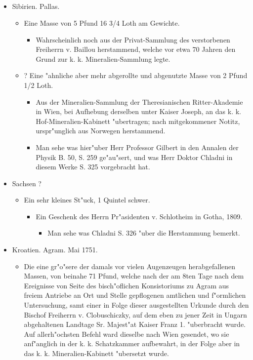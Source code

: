 \documentclass[a4paper, 11pt, oneside, polutonikogreek, german]{article}
\begin{document}
\subsection{}
\begin{itemize}
    \item Sibirien. Pallas.
    \begin{itemize}
        \item Eine Masse von 5 Pfund 16 3/4 Loth am Gewichte.
        \begin{itemize}
            \item Wahrscheinlich noch aus der Privat-Sammlung des verstorbenen Freiherrn v. Baillou herstammend, welche vor etwa 70 Jahren den Grund zur k. k. Mineralien-Sammlung legte.
        \end{itemize}
        \item ? Eine "ahnliche aber mehr abgerollte und abgenutzte Masse von 2 Pfund 1/2 Loth.
        \begin{itemize}
            \item Aus der Mineralien-Sammlung der Theresianischen Ritter-Akademie in Wien, bei Aufhebung derselben unter Kaiser Joseph, an das k. k. Hof-Mineralien-Kabinett "ubertragen; nach mitgekommener Notitz, urspr"unglich aus Norwegen herstammend.
            \item Man sehe was hier"uber Herr Professor Gilbert in den Annalen der Physik B. 50, S. 259 ge"au"sert, und was Herr Doktor Chladni in diesem Werke S. 325 vorgebracht hat.
        \end{itemize}
    \end{itemize}
    \item Sachsen ?
    \begin{itemize}
        \item Ein sehr kleines St"uck, 1 Quintel schwer.
        \begin{itemize}
            \item Ein Geschenk des Herrn Pr"asidenten v. Schlotheim in Gotha, 1809.
            \begin{itemize}
                \item Man sehe was Chladni S. 326 "uber die Herstammung bemerkt.
            \end{itemize}
        \end{itemize}
    \end{itemize}
    \item Kroatien. Agram. Mai 1751.
    \begin{itemize}
        \item Die eine gr"o"sere der damals vor vielen Augenzeugen herabgefallenen Massen, von beinahe 71 Pfund, welche nach der am 8ten Tage nach dem Ereignisse von Seite des bisch"oflichen Konsistoriums zu Agram aus freiem Antriebe an Ort und Stelle gepflogenen amtlichen und f"ormlichen Untersuchung, samt einer in Folge dieser ausgestellten Urkunde durch den Bischof Freiherrn v. Clobuschiczky, auf dem eben zu jener Zeit in Ungarn abgehaltenen Landtage Sr. Majest"at Kaiser Franz 1. "uberbracht wurde. Auf allerh"ochsten Befehl ward dieselbe nach Wien gesendet, wo sie anf"anglich in der k. k. Schatzkammer aufbewahrt, in der Folge aber in das k. k. Mineralien-Kabinett "ubersetzt wurde.

\end{itemize}
\end{itemize}
\end{document}
